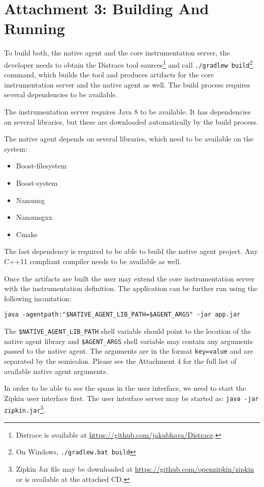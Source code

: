 \chapter*{Attachment 3: Building And Running}
To build both, the native agent and the core instrumentation server, the developer needs to obtain the Distrace tool sources\footnote{Distrace is available at \url{https://github.com/jakubhava/Distrace}.} and call \texttt{./gradlew build}\footnote{On Windows, \texttt{./gradlew.bat build}} command, which builds the tool and produces artifacts for the core instrumentation server and the native agent as well. The build process requires several dependencies to be available.

The instrumentation server requires Java 8 to be available. It has dependencies on several libraries, but these are downloaded automatically by the build process.

The native agent depends on several libraries, which need to be available on the system:
\begin{itemize}
	\item Boost-filesystem
	\item Boost-system
	\item Nanomsg
	\item Nanomsgxx
	\item Cmake
\end{itemize}
The last dependency is required to be able to build the native agent project. Any C++11 compliant compiler needs to be available as well.

Once the artifacts are built the user may extend the core instrumentation server with the instrumentation definition. The application can be further run using the following incantation:

\texttt{java -agentpath:"\$NATIVE\_AGENT\_LIB\_PATH=\$AGENT\_ARGS" -jar app.jar}

The \texttt{\$NATIVE\_AGENT\_LIB\_PATH} shell variable should point to the location of the native agent library and \texttt{\$AGENT\_ARGS} shell variable may contain any arguments passed to the native agent. The arguments are in the format \texttt{key=value} and are separated by the semicolon. Please see the Attachment 4 for the full list of available native agent arguments.

In order to be able to see the spans in the user interface, we need to start the Zipkin user interface first. The user interface server may be started as: \texttt{java -jar zipkin.jar}\footnote{Zipkin Jar file may be downloaded at \url{https://github.com/openzipkin/zipkin} or is available at the attached CD.}.
